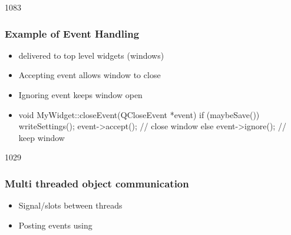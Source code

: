 \begin{slide}[fragile]{1083}
\frametitle{Example of Event Handling}

\begin{itemize}
\item {} delivered to top level widgets (windows)
\item Accepting event allows window to close
\item Ignoring event keeps window open
\item[]
\begin{cpp}
void MyWidget::closeEvent(QCloseEvent *event) {
  if (maybeSave()) {
    writeSettings();
    event->accept(); // close window
  } else {
    event->ignore(); // keep window
  }
}
\end{cpp}  
\end{itemize}
\end{slide}

\begin{slide}{1029}\frametitle{Multi threaded object communication}
  \begin{itemize}
  \item Signal/slots between threads
  \item Posting events using 
  \end{itemize}
\end{slide}

